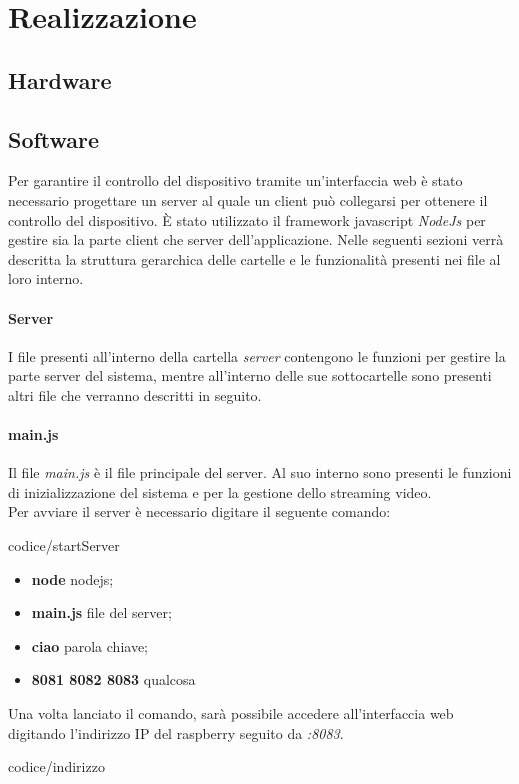 \documentclass[11pt]{article}
\begin{document}
\section{Realizzazione}
\subsection{Hardware} 
\subsection{Software}
Per garantire il controllo del dispositivo tramite un'interfaccia web è stato necessario progettare un server al quale un client può collegarsi per ottenere il controllo del dispositivo. È stato utilizzato il framework javascript \textit{NodeJs} per gestire sia la parte client che server dell'applicazione. Nelle seguenti sezioni verrà descritta la struttura gerarchica delle cartelle e le funzionalità presenti nei file al loro interno.
\paragraph{Server}
I file presenti all'interno della cartella \textit{server} contengono le funzioni per gestire la parte server del sistema, mentre all'interno delle sue sottocartelle sono presenti altri file che verranno descritti in seguito.\\
\paragraph{main.js}
Il file \textit{main.js} è il file principale del server. Al suo interno sono presenti le funzioni di inizializzazione del sistema e per la gestione dello streaming video.\\
Per avviare il server è necessario digitare il seguente comando:
\begin{lstinputlisting}[caption={Avvio server},basicstyle=\tiny]{codice/startServer}\end{lstinputlisting}
\begin{itemize}
	\item \textbf{node} nodejs;
	\item \textbf{main.js} file del server;
	\item \textbf{ciao} parola chiave; 
	\item \textbf{8081 8082 8083}  qualcosa 
\end{itemize}
Una volta lanciato il comando, sarà possibile accedere all'interfaccia web digitando l'indirizzo IP del raspberry seguito da \textit{:8083}.
\begin{lstinputlisting}[caption={Esempio indirizzo server},basicstyle=\tiny]{codice/indirizzo}\end{lstinputlisting}
\end{document}
